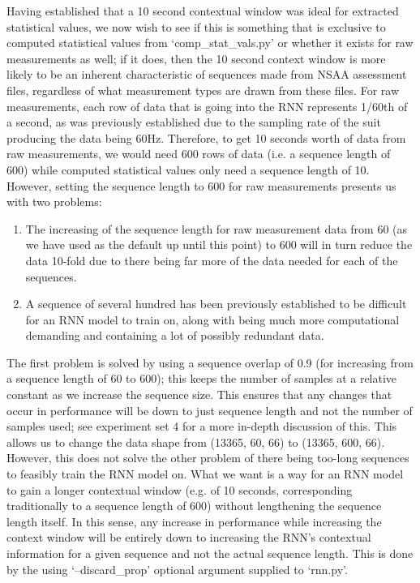 \documentclass[12pt,twoside]{report}
\begin{document}
\quad Having established that a 10 second contextual window was ideal for extracted statistical values, we now wish to see if this is something that is exclusive to computed statistical values from ‘comp\_stat\_vals.py’ or whether it exists for raw measurements as well; if it does, then the 10 second context window is more likely to be an inherent characteristic of sequences made from NSAA assessment files, regardless of what measurement types are drawn from these files. For raw measurements, each row of data that is going into the RNN represents 1/60th of a second, as was previously established due to the sampling rate of the suit producing the data being 60Hz. Therefore, to get 10 seconds worth of data from raw measurements, we would need 600 rows of data (i.e. a sequence length of 600) while computed statistical values only need a sequence length of 10. However, setting the sequence length to 600 for raw measurements presents us with two problems:

\begin{enumerate}
	\item The increasing of the sequence length for raw measurement data from 60 (as we have used as the default up until this point) to 600 will in turn reduce the data 10-fold due to there being far more of the data needed for each of the sequences.
	\item A sequence of several hundred has been previously established to be difficult for an RNN model to train on, along with being much more computational demanding and containing a lot of possibly redundant data.
\end{enumerate}

\quad The first problem is solved by using a sequence overlap of 0.9 (for increasing from a sequence length of 60 to 600); this keeps the number of samples at a relative constant as we increase the sequence size. This ensures that any changes that occur in performance will be down to just sequence length and not the number of samples used; see experiment set 4 for a more in-depth discussion of this. This allows us to change the data shape from (13365, 60, 66) to (13365, 600, 66). However, this does not solve the other problem of there being too-long sequences to feasibly train the RNN model on. What we want is a way for an RNN model to gain a longer contextual window (e.g. of 10 seconds, corresponding traditionally to a sequence length of 600) without lengthening the sequence length itself. In this sense, any increase in performance while increasing the context window will be entirely down to increasing the RNN’s contextual information for a given sequence and not the actual sequence length. This is done by the using ‘--discard\_prop’ optional argument supplied to ‘rnn.py’.\\
\end{document}
